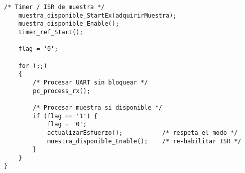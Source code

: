 \begin{lstlisting}[style=cstyle,
	caption={Código desarrollado para la implementación de los compensadores con el PSoC en lenguaje C.},
	label={c:psoc}
	]
	/* Timer / ISR de muestra */
	muestra_disponible_StartEx(adquirirMuestra);
	muestra_disponible_Enable();
	timer_ref_Start();
	
	flag = '0';
	
	for (;;)
	{
		/* Procesar UART sin bloquear */
		pc_process_rx();
		
		/* Procesar muestra si disponible */
		if (flag == '1') {
			flag = '0';
			actualizarEsfuerzo();           /* respeta el modo */
			muestra_disponible_Enable();    /* re-habilitar ISR */
		}
	}
}

\end{lstlisting}